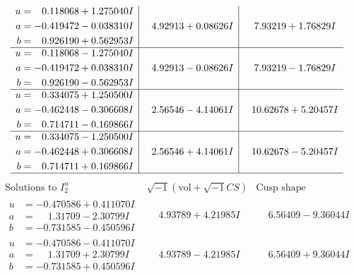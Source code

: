 \documentclass[1p]{elsarticle_modified}
\theoremstyle{definition}
\newcommand{\I}{\sqrt{-1}}
\begin{document}
$$\begin{array}{c|c|c}
\begin{aligned}
u &= \phantom{-}0.118068 + 1.275040 I \\
a &= -0.419472 - 0.038310 I \\
b &= \phantom{-}0.926190 + 0.562953 I\end{aligned}
 & \phantom{-}4.92913 + 0.08626 I & \phantom{-}7.93219 + 1.76829 I \\ \hline\begin{aligned}
u &= \phantom{-}0.118068 - 1.275040 I \\
a &= -0.419472 + 0.038310 I \\
b &= \phantom{-}0.926190 - 0.562953 I\end{aligned}
 & \phantom{-}4.92913 - 0.08626 I & \phantom{-}7.93219 - 1.76829 I \\ \hline\begin{aligned}
u &= \phantom{-}0.334075 + 1.250500 I \\
a &= -0.462448 - 0.306608 I \\
b &= \phantom{-}0.714711 - 0.169866 I\end{aligned}
 & \phantom{-}2.56546 - 4.14061 I & \phantom{-}10.62678 + 5.20457 I \\ \hline\begin{aligned}
u &= \phantom{-}0.334075 - 1.250500 I \\
a &= -0.462448 + 0.306608 I \\
b &= \phantom{-}0.714711 + 0.169866 I\end{aligned}
 & \phantom{-}2.56546 + 4.14061 I & \phantom{-}10.62678 - 5.20457 I\\
 \hline 
 \end{array}$$\newpage$$\begin{array}{c|c|c}  
\text{Solutions to }I^u_{2}& \I (\text{vol} + \sqrt{-1}CS) & \text{Cusp shape}\\
 \hline 
\begin{aligned}
u &= -0.470586 + 0.411070 I \\
a &= \phantom{-}1.31709 - 2.30799 I \\
b &= -0.731585 - 0.450596 I\end{aligned}
 & \phantom{-}4.93789 + 4.21985 I & \phantom{-}6.56409 - 9.36044 I \\ \hline\begin{aligned}
u &= -0.470586 - 0.411070 I \\
a &= \phantom{-}1.31709 + 2.30799 I \\
b &= -0.731585 + 0.450596 I\end{aligned}
 & \phantom{-}4.93789 - 4.21985 I & \phantom{-}6.56409 + 9.36044 I \\ \hline\begin{aligned}

\end{aligned}
\end{array}$$
\end{document}
